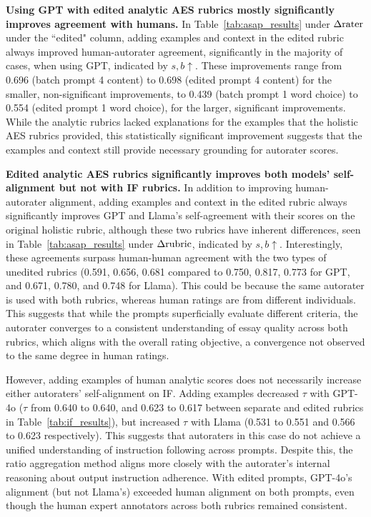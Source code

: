
\textbf{Using GPT with edited analytic AES rubrics mostly significantly improves agreement with humans.} In Table~\ref{tab:asap_results} under $\Delta\textnormal{rater}$ under the ``edited" column, adding examples and context in the edited rubric always improved human-autorater agreement, significantly in the majority of cases, when using GPT, indicated by $s,b\uparrow$. These improvements range from 0.696 (batch prompt 4 content) to 0.698 (edited prompt 4 content) for the smaller, non-significant improvements, to 0.439 (batch prompt 1 word choice) to 0.554 (edited prompt 1 word choice), for the larger, significant improvements. While the analytic rubrics lacked explanations for the examples that the holistic AES rubrics provided, this statistically significant improvement suggests that the examples and context still provide necessary grounding for autorater scores.

\textbf{Edited analytic AES rubrics significantly improves both models' self-alignment but not with IF rubrics.} In addition to improving human-autorater alignment, adding examples and context in the edited rubric always significantly improves GPT and Llama's self-agreement with their scores on the original holistic rubric, although these two rubrics have inherent differences, seen in Table~\ref{tab:asap_results} under $\Delta\textnormal{rubric}$, indicated by $s,b\uparrow$. Interestingly, these agreements surpass human-human agreement with the two types of unedited rubrics (0.591, 0.656, 0.681 compared to 0.750, 0.817, 0.773 for GPT, and 0.671, 0.780, and 0.748 for Llama). This could be because the same autorater is used with both rubrics, whereas human ratings are from different individuals. This suggests that while the prompts superficially evaluate different criteria, the autorater converges to a consistent understanding of essay quality across both rubrics, which aligns with the overall rating objective, a convergence not observed to the same degree in human ratings.

However, adding examples of human analytic scores does not necessarily increase either autoraters' self-alignment on IF. Adding examples decreased $\tau$ with GPT-4o ($\tau$ from 0.640 to 0.640, and 0.623 to 0.617 between separate and edited rubrics in Table~\ref{tab:if_results}), but increased $\tau$ with Llama (0.531 to 0.551 and 0.566 to 0.623 respectively). This suggests that autoraters in this case do not achieve a unified understanding of instruction following across prompts. Despite this, the ratio aggregation method aligns more closely with the autorater's internal reasoning about output instruction adherence. With edited prompts, GPT-4o's alignment (but not Llama's) exceeded human alignment on both prompts, even though the human expert annotators across both rubrics remained consistent.

